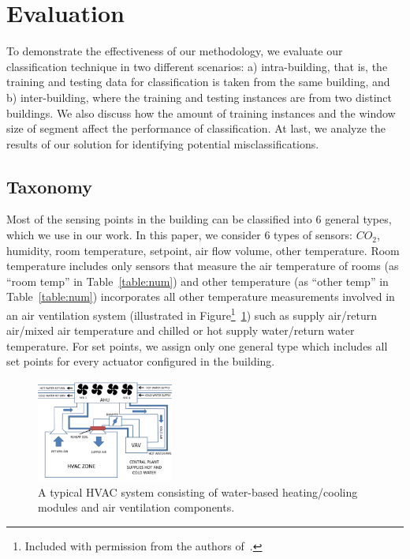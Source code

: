\section{Evaluation}
To demonstrate the effectiveness of our methodology, we evaluate our classification technique in two different scenarios: a) intra-building, that is, the 
training and testing data for classification is taken from the same building, and b) inter-building, where the training and testing instances are from two 
distinct buildings. We also discuss how the amount of training instances and the window size of segment affect the performance of classification.
At last, we analyze the results of our solution for identifying potential misclassifications.

\subsection{Taxonomy}
Most of the sensing points in the building can be classified into 6 general types, which we use in our work.
In this paper, we consider 6 types of sensors: $CO_{2}$, humidity, room temperature, setpoint, air flow volume, other temperature.  Room 
temperature includes only sensors that measure the air temperature of rooms (as ``room temp'' in Table~\ref{table:num}) and other temperature (as ``other temp'' 
in Table~\ref{table:num}) incorporates all other temperature measurements involved in an air ventilation system (illustrated in Figure\footnote{Included 
with permission from the authors of~\cite{sentinel}.}~\ref{fig:hvac}) such as supply air/return air/mixed air temperature and chilled or hot supply water/return water temperature. 
For set points, we assign only one general type which includes all set points for every actuator configured in the building.

\begin{figure}[ht!]
\centering
\includegraphics[width=0.4\textwidth]{./fig/hvac.pdf}
\caption{A typical HVAC system consisting of water-based heating/cooling modules and air ventilation components.}
\label{fig:hvac}
\end{figure}

